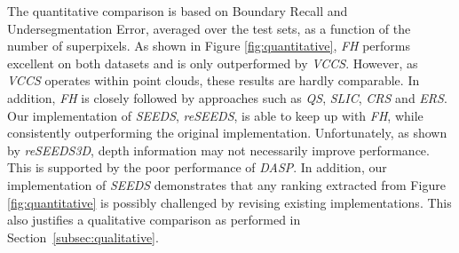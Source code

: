 \documentclass[runningheads]{llncs}
\begin{document}
    
    The quantitative comparison is based on Boundary Recall and Undersegmentation Error, averaged over the test sets, as a function of the number of superpixels. As shown in Figure \ref{fig:quantitative}, \textit{FH} performs excellent on both datasets and is only outperformed by \textit{VCCS}. However, as \textit{VCCS} operates within point clouds, these results are hardly comparable. In addition, \textit{FH} is closely followed by approaches such as \textit{QS}, \textit{SLIC}, \textit{CRS} and \textit{ERS}. Our implementation of \textit{SEEDS}, \textit{reSEEDS}, is able to keep up with \textit{FH}, while consistently outperforming the original implementation. Unfortunately, as shown by \textit{reSEEDS3D}, depth information may not necessarily improve performance. This is supported by the poor performance of \textit{DASP}. In addition, our implementation of \textit{SEEDS} demonstrates that any ranking extracted from Figure \ref{fig:quantitative} is possibly challenged by revising existing implementations. This also justifies a qualitative comparison as performed in Section~\ref{subsec:qualitative}.
\end{document}
